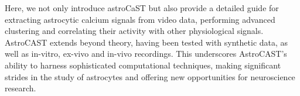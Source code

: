 Here, we not only introduce astroCaST but also provide a detailed guide for extracting astrocytic calcium signals from video data, performing advanced clustering and correlating their activity with other physiological signals. AstroCAST extends beyond theory, having been tested with synthetic data, as well as in-vitro, ex-vivo and in-vivo recordings. This underscores AstroCAST’s ability to harness sophisticated computational techniques, making significant strides in the study of astrocytes and offering new opportunities for neuroscience research.
